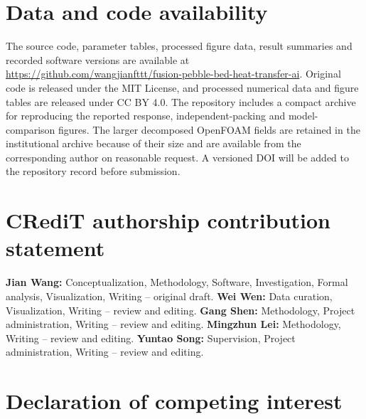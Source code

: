 \documentclass[preprint,12pt]{elsarticle}
\newcommand{\OpenFOAM}{OpenFOAM}
\begin{document}

\section*{Data and code availability}

The source code, parameter tables, processed figure data, result summaries and
recorded software versions are available at
\url{https://github.com/wangjianfttt/fusion-pebble-bed-heat-transfer-ai}.
Original code is released under the MIT License, and processed numerical data
and figure tables are released under CC BY 4.0. The repository includes a
compact archive for reproducing the reported response, independent-packing and
model-comparison figures. The larger decomposed \OpenFOAM{} fields are retained
in the institutional archive because of their size and are available from the
corresponding author on reasonable request. A versioned DOI will be added to
the repository record before submission.

\section*{CRediT authorship contribution statement}

\textbf{Jian Wang:} Conceptualization, Methodology, Software, Investigation, Formal analysis, Visualization, Writing -- original draft.
\textbf{Wei Wen:} Data curation, Visualization, Writing -- review and editing.
\textbf{Gang Shen:} Methodology, Project administration, Writing -- review and editing.
\textbf{Mingzhun Lei:} Methodology, Writing -- review and editing.
\textbf{Yuntao Song:} Supervision, Project administration, Writing -- review and editing.

\section*{Declaration of competing interest}
\end{document}
